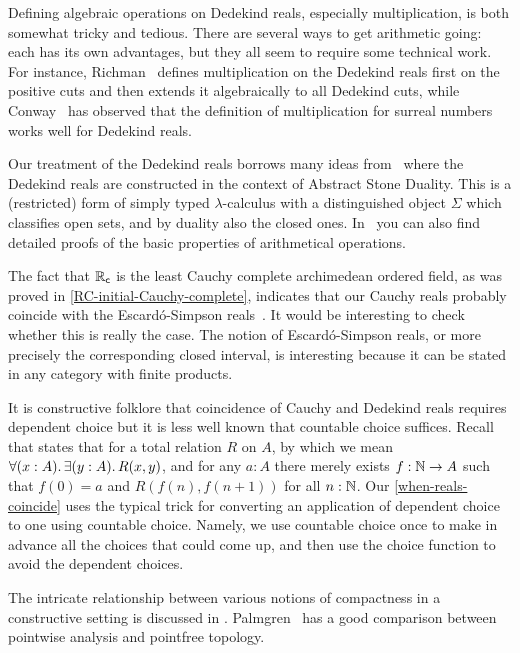 Defining algebraic operations on Dedekind reals, especially multiplication, is both somewhat tricky and tedious.
There are several ways to get arithmetic going: each has its own advantages, but they all seem to require some technical work.
For instance, Richman~\cite{Richman:reals} defines multiplication on the Dedekind reals first on the positive cuts and then extends it algebraically to all Dedekind cuts, while Conway~\cite{conway:onag} has observed that the definition of multiplication for surreal numbers works well for Dedekind reals.

Our treatment of the Dedekind reals borrows many ideas from~\cite{BauerTaylor09} where the Dedekind reals are constructed in the context of Abstract Stone Duality. This is a (restricted) form of simply typed $\lambda$-calculus with a distinguished object $\Sigma$ which classifies open sets, and by duality also the closed ones. In~\cite{BauerTaylor09} you can also find detailed proofs of the basic properties of arithmetical operations.

The fact that $\mathbb{R}_\mathsf{c}$ is the least Cauchy complete archimedean ordered field, as was proved in \autoref{RC-initial-Cauchy-complete}, indicates that our Cauchy reals probably coincide with the Escard{\'o}-Simpson reals~\cite{EscardoSimpson:01}. It would be interesting to check whether this is really the case. The notion of Escard{\'o}-Simpson reals, or more precisely the corresponding closed interval, is interesting because it can be stated in any category with finite products.

It is constructive folklore that coincidence of Cauchy and Dedekind reals requires dependent choice but it is less well known that countable choice suffices. Recall that 
%
%
states that for a total relation $R$ on $A$, by which we mean $\fall{x : A} \exis{y : A} R(x,y)$, and for any $a : A$ there merely exists $f : \mathbb{N} \to A$ such that $f(0) = a$ and $R(f(n), f(n+1))$ for all $n : \mathbb{N}$. Our \autoref{when-reals-coincide} uses the typical trick for converting an application of dependent choice to one using countable choice. Namely, we use countable choice once to make in advance all the choices that could come up, and then use the choice function to avoid the dependent choices.

The intricate relationship between various notions of compactness in a constructive
setting is discussed in \cite{bridges2002compactness}. Palmgren~\cite{Palmgren:FT} has a 
good comparison between pointwise analysis and 
pointfree topology.

